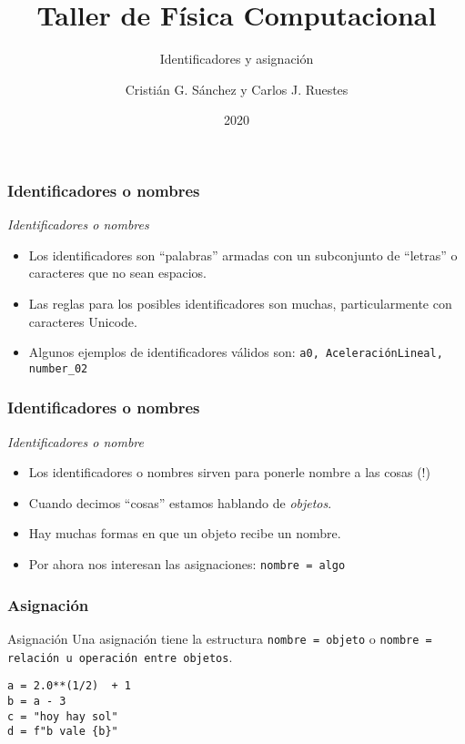 \documentclass{beamer}
\title{Taller de Física Computacional}
\subtitle{Identificadores y asignación}
\author{Cristián G. Sánchez y Carlos J. Ruestes}
\date{2020}
\begin{document}
\frame{\titlepage}

\begin{frame}[fragile]
\frametitle{Identificadores o nombres}
\begin{block}{{\em Identificadores o nombres}}
\begin{itemize}
\item Los identificadores son ``palabras'' armadas con un subconjunto de ``letras'' o caracteres que no sean espacios.
\item Las reglas para los posibles identificadores son muchas, particularmente con caracteres Unicode.
\item Algunos ejemplos de identificadores válidos son: \texttt{a0, AceleraciónLineal, number_02}
\end{itemize}
\end{block}
\end{frame}

\begin{frame}[fragile]
\frametitle{Identificadores o nombres}
\begin{block}{{\em Identificadores o nombre}}
\begin{itemize}
\item Los identificadores o nombres sirven para ponerle nombre a las cosas (!)
\item Cuando decimos ``cosas'' estamos hablando de {\em objetos}.
\item Hay muchas formas en que un objeto recibe un nombre.
\item Por ahora nos interesan las \alert{asignaciones}: {\tt nombre = algo}
\end{itemize}
\end{block}
\end{frame}

\begin{frame}[fragile]
\frametitle{Asignación}
\begin{block}{Asignación}
Una asignación tiene la estructura \texttt{nombre = objeto} o  \texttt{nombre = relación u operación entre objetos}.
\begin{verbatim}
a = 2.0**(1/2)  + 1
b = a - 3
c = "hoy hay sol"
d = f"b vale {b}"
\end{verbatim}
\end{block}
\end{frame}
\end{document}
